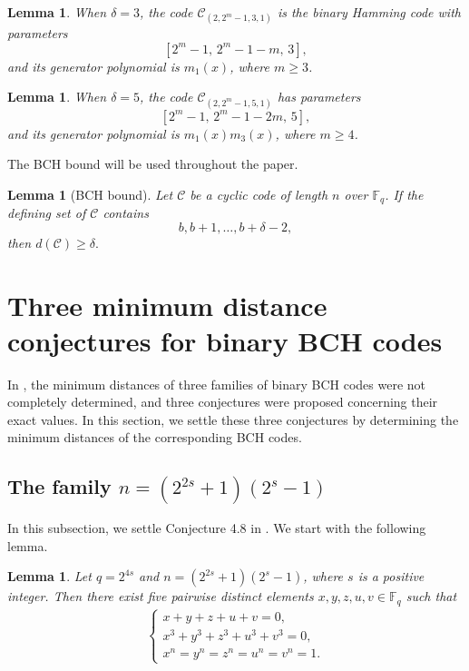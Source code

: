 \documentclass[12pt,draftcls,journal,onecolumn]{IEEEtran}
\newtheorem{lemma}[theorem]{Lemma}
\newcommand{\C}{{\mathcal{C}}}
\begin{document}
\begin{lemma}\cite{DingP}
 When \(\delta=3\), the code \(\mathcal C_{(2,2^m-1,3,1)}\) is the binary Hamming code with parameters
  \[
  [2^m-1,\,2^m-1-m,\,3],
  \]
  and its generator polynomial is \(m_1(x)\), where \(m\ge 3\).
  \end{lemma}

\begin{lemma}\cite{DingP}\label{eq:5pri}
When \(\delta=5\), the code \(\mathcal C_{(2,2^m-1,5,1)}\) has parameters
  \[
  [2^m-1,\,2^m-1-2m,\,5],
  \]
  and its generator polynomial is \(m_1(x)m_3(x)\), where \(m\ge 4\).
\end{lemma}

The BCH bound will be used throughout the paper.

\begin{lemma}[BCH bound]\label{lem:BCHbound}
Let $\mathcal{C}$ be a cyclic code of length $n$ over $\mathbb{F}_q$. If the
defining set of $\mathcal{C}$ contains
\[
b,b+1,\ldots,b+\delta-2,
\]
then
$
d(\C)\ge\delta.
$
\end{lemma}



\section{Three minimum distance conjectures for binary BCH codes}

In \cite{Chen59}, the minimum distances of three families of binary BCH codes were not completely determined, and three conjectures were proposed concerning their exact values. In this section, we settle these three conjectures by determining the minimum distances of the corresponding BCH codes.



\subsection{The family $n=(2^{2s}+1)(2^s-1)$}

In this subsection, we settle Conjecture 4.8 in \cite{Chen59}.  We start with the following lemma.


\begin{lemma}\label{lem:1}
Let $q=2^{4s}$ and $n=(2^{2s}+1)(2^s-1)$, where $s$ is a positive integer.
Then there exist five pairwise distinct elements
$
x,y,z,u,v\in \mathbb{F}_{q}
$ such that
\begin{eqnarray*}
\begin{cases}
x+y+z+u+v=0,  \\
x^3+y^3+z^3+u^3+v^3=0,\\
x^n=y^n=z^n=u^n=v^n=1.
\end{cases}
\end{eqnarray*}
\end{lemma}
\end{document}

